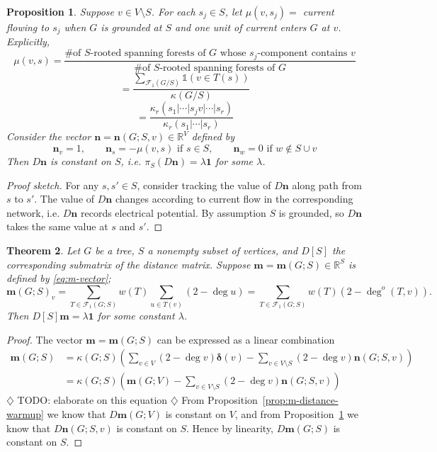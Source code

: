\documentclass{amsart}
\newtheorem{thm}{Theorem}
\newtheorem{prop}[thm]{Proposition}
\theoremstyle{definition}
\newcommand{\RR}{\mathbb{R}}
\newcommand{\bone}{\mathbf{1}}
\newcommand{\bolddelta}{\bm{\delta}}
\newcommand{\boldm}{\mathbf{m}}
\newcommand{\boldn}{\mathbf{n}}
\newcommand{\trees}{\mathcal{F}_1}
\newcommand{\degout}{\deg^o}
\newcommand{\note}[1]{{\color{red} \sf $\diamondsuit$  {#1} $\diamondsuit$ }}
\begin{document}
\begin{prop}
\label{prop:n-vector}
Suppose $v \in V \setminus S$.
For each $s_j \in S$, let $\mu(v,s_j) = $ current flowing to $s_j$
when 
$G$ is grounded at $S$
and 
one unit of current enters $G$ at $v$.
Explicitly,
\begin{equation*}
\mu(v,s) =  \frac{\text{\# of $S$-rooted spanning forests of $G$ whose $s_j$-component contains $v$}}{\text{\# of $S$-rooted spanning forests of $G$}}
\end{equation*}
\[
= \frac{\sum_{\trees(G/S)} \mathds{1}(v \in T(s))}{\kappa(G/S)}
\]
\[
= \frac{\kappa_{r}(s_1|\cdots|s_j v| \cdots|s_r)}{\kappa_r(s_1|\cdots|s_r)}
\]
Consider the vector $\mathbf{n} = \mathbf{n}(G;S,v) \in \RR^V$ defined by
\[
	\mathbf{n}_v = 1,\qquad
	\mathbf{n}_s = -\mu(v,s) \text{ if }s \in S, \qquad
	\mathbf{n}_w = 0 \text{ if } w \not\in S \cup v
\]
Then $D\mathbf{n}$ is constant on $S$, i.e. $\pi_S( D \mathbf{n}) = \lambda \mathbf{1}$ for some $\lambda$.
\end{prop}
\begin{proof}[Proof sketch]
For any $s, s' \in S$, consider tracking the value of $D \mathbf{n}$ along path from $s$ to $s'$. 
The value of $D \mathbf{n}$ changes according to current flow in the corresponding network, i.e. $D \mathbf{n}$ records electrical potential.
By assumption $S$ is grounded, so $D\mathbf{n}$ takes the same value at $s$ and $s'$.
\end{proof}

\begin{thm}
Let $G$ be a tree, $S$ a nonempty subset of vertices,
and $D[S]$ the corresponding submatrix of the distance matrix.
Suppose $\boldm = \boldm(G;S) \in \RR^{S}$ is defined by \eqref{eq:m-vector};
\begin{equation}
\boldm(G;S)_v = \sum_{T \in \trees(G;S)} w(T) \sum_{u \in T(v)} (2 - \deg u) 
= \sum_{T \in \trees(G;S)} w(T) (2 - \degout(T,v)) .
\end{equation}
Then $D[S] \boldm = \lambda \bone$
for some constant $\lambda$.
\end{thm}
\begin{proof}
The vector $\boldm = \boldm(G;S)$ can be expressed as a linear combination
\begin{align}
	\boldm (G;S)
	&= \kappa(G;S) \left( \sum_{v \in V}(2 - \deg v) {\bolddelta}(v) 
	- \sum_{v \in V \setminus S} (2 - \deg v) \mathbf{n}(G;S,v) 
	\right) \\
	&= \kappa(G;S) \left( \boldm(G;V) - \sum_{v\in V\setminus S} (2 - \deg v) \boldn(G;S,v) \right)
\end{align}
\note{TODO: elaborate on this equation}
From Proposition~\ref{prop:m-distance-warmup} we know that $D \boldm(G;V)$ is constant on $V$,
and from Proposition~\ref{prop:n-vector} we know that $D \boldn(G;S,v)$ is constant on $S$.
Hence by linearity, $D \boldm(G;S)$ is constant on $S$.
\end{proof}
\end{document}
